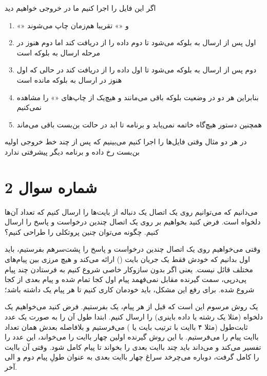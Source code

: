 \noindent
اگر این فایل را اجرا کنیم ما در خروجی خواهیم دید
\begin{enumerate}
    \item «» و «» تقریبا هم‌زمان چاپ می‌شوند
    \item {} اول پس از ارسال به  بلوکه می‌شود تا  دوم داده را از  دریافت کند اما  دوم هنوز در مرحله ارسال به  بلوکه است
    \item {} دوم پس از ارسال به  بلوکه می‌شود تا  اول داده را از  دریافت کند در حالی که  اول هنوز در ارسال به  بلوکه مانده است
    \item بنابراین هر دو  در وضعیت بلوکه باقی می‌مانند و هیچ‌یک از چاپ‌های «» را مشاهده نمی‌کنیم
    \item همچنین دستور  هیچ‌گاه خاتمه نمی‌یابد و برنامه تا ابد در حالت بن‌بست باقی می‌ماند
\end{enumerate}

\bigskip

در هر دو مثال وقتی فایل‌ها را اجرا کنیم می‌بینیم که پس از چند خط خروجی اولیه بن‌بست رخ داده و برنامه دیگر پیشرفتی ندارد 



\section*{شماره سوال 2}

می‌دانیم که می‌توانیم روی یک اتصال  یک دنباله از بایت‌ها را ارسال کنیم که تعداد آن‌ها دلخواه است. فرض کنید بخواهیم بر روی یک اتصال  چندین درخواست و پاسخ را ارسال کنیم. چگونه می‌توان چنین پروتکلی را طراحی کنیم؟

وقتی می‌خواهیم روی یک اتصال  چندین درخواست و پاسخ را پشت‌سرهم بفرستیم، باید اول بدانیم که  خودش فقط یک جریان بایت () ارائه می‌کند و هیچ مرزی بین پیام‌های مختلف قائل نیست. یعنی اگر بدون سازوکار خاصی شروع کنیم به فرستادن چند پیام پی‌درپی، سمت گیرنده مقابل نمی‌فهمد پیام اول کجا تمام شده و پیام بعدی از کجا شروع شده. برای رفع این مشکل، باید خودمان کاری کنیم تا هر پیام یک  داشته باشد؛

یک روش مرسوم این است که قبل از هر پیام، یک  بفرستیم. فرض کنید می‌خواهیم یک  دلخواه (مثلا یک رشته  یا داده باینری) را ارسال کنیم. ابتدا طول آن  را به صورت یک عدد ثابت‌طول (مثلا ۴ باایت با ترتیب بایت  یا ) می‌فرستیم و بلافاصله بعدش همان تعداد باایت پیام را می‌فرستیم. با این روش گیرنده اولین چهار باایت را می‌خواند، این عدد را تفسیر می‌کند و می‌داند باید چند باایت بعدی را بخواند تا پیام کامل شود. وقتی آن  باایت را کامل گرفت، دوباره می‌چرخد سراغ چهار باایت بعدی به عنوان طولِ پیام دوم و الی آخر. 

